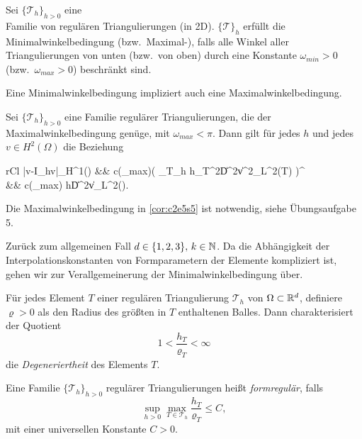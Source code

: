 \documentclass[../skript.tex]{subfiles}
\begin{document}
\begin{definition}\label{def:c2e5s3}
	Sei $\{\mathcal{T}_h\}_{h>0}$ eine \\ Familie von regulären Triangulierungen (in 2D). $\{\mathcal{T}\}_h$ erfüllt die Minimalwinkelbedingung (bzw.\ Maximal-), falls alle Winkel aller Triangulierungen von unten (bzw.\ von oben) durch eine Konstante $\omega_{min}>0$ (bzw.\ $\omega_{max}>0$) beschränkt sind. 
\end{definition}
\begin{remark}\label{rem:c2e5s4}
	Eine Minimalwinkelbedingung impliziert auch eine Maximalwinkelbedingung.
\end{remark}

\begin{corollary}\label{cor:c2e5s5}
	Sei $\{\mathcal{T}_h\}_{h>0}$ eine Familie regulärer Triangulierungen, die der Maximalwinkelbedingung genüge, mit $\omega_{max}<\pi$. Dann gilt für jedes $h$ und jedes $v\in H^2(\Omega)$ die Beziehung
	\begin{IEEEeqnarray*}{rCl}
		|v-I_hv|_{H^1(\Omega)} &\leq& c(\omega_{max})\left( \sum_{T\in{}_h} h_T^2\|D^2v\|^2_{L^2(T)} \right)^{} \\
		&\leq& c(\omega_{max}) h\|D^2v\|_{L^2(\Omega)}.
	\end{IEEEeqnarray*}
\end{corollary}
\begin{remark}\label{rem:c2e5s6}
	Die Maximalwinkelbedingung in \cref{cor:c2e5s5} ist notwendig, siehe Übungsaufgabe 5.
\end{remark}
Zurück zum allgemeinen Fall $d\in\{1,2,3\},\,k\in\mathbb{N}$. Da die Abhängigkeit der Interpolationskonstanten von Formparametern der Elemente kompliziert ist, gehen wir zur Verallgemeinerung der Minimalwinkelbedingung über.
\begin{definition}\label{def:c2e5s7}
	Für jedes Element $T$ einer regulären Triangulierung $\mathcal{T}_h$ von $\Omega\subset\mathbb{R}^d$, definiere $\varrho>0$ als den Radius des größten in $T$ enthaltenen Balles. Dann charakterisiert der Quotient
	\[
		1 < \frac{h_T}{\varrho_T} < \infty
	\]
	die \emph{Degeneriertheit} des Elements $T$. \par
	Eine Familie $\{\mathcal{T}_h\}_{h>0}$ regulärer Triangulierungen heißt \emph{formregulär}, falls
	\[
		\sup_{h>0}\max_{T\in\mathcal{T}_h} \frac{h_T}{\varrho_T}\leq C,
	\]
	mit einer universellen Konstante $C>0$.
\end{definition}
\end{document}
